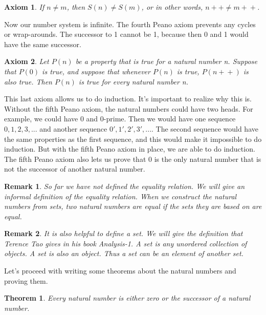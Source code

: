 \documentclass{article}
\newtheorem{axiom}{Axiom}
\newtheorem{theorem}{Theorem}
\newtheorem{remark}{Remark}
\newcommand{\inc}[1]{#1\!+\!+}
\begin{document}
\begin{axiom}
If $n \neq m$, then $S(n) \neq S(m)$, or in other words, $\inc{n} \neq \inc{m}$.
\end{axiom}

Now our number system is infinite. The fourth Peano axiom prevents any cycles or wrap-arounds. The successor to 1 cannot be 1, because then 0 and 1 would have the same successor. 

\begin{axiom}
Let $P(n)$ be a property that is true for a natural number n. Suppose that $P(0)$ is true, and suppose that whenever $P(n)$ is true, $P(\inc{n})$ is also true. Then $P(n)$ is true for every natural number n.
\end{axiom}

This last axiom allows us to do induction. It's important to realize why this is. \\

Without the fifth Peano axiom, the natural numbers could have two heads. For example, we could have 0 and 0-prime. Then we would have one sequence $0, 1, 2, 3, ...$ and another sequence $0', 1', 2', 3', ...$. The second sequence would have the same properties as the first sequence, and this would make it impossible to do induction. But with the fifth Peano axiom in place, we are able to do induction. The fifth Peano axiom also lets us prove that 0 is the only natural number that is not the successor of another natural number.

\begin{remark}
So far we have not defined the equality relation. We will give an informal definition of the equality relation. When we construct the natural numbers from sets, two natural numbers are equal if the sets they are based on are equal.
\end{remark}

\begin{remark}
It is also helpful to define a set. We will give the definition that Terence Tao gives in his book Analysis-1. A set is any unordered collection of objects. A set is also an object. Thus a set can be an element of another set.
\end{remark}

Let's proceed with writing some theorems about the natural numbers and proving them.

\begin{theorem}
Every natural number is either zero or the successor of a natural number.
\end{theorem}
\end{document}
